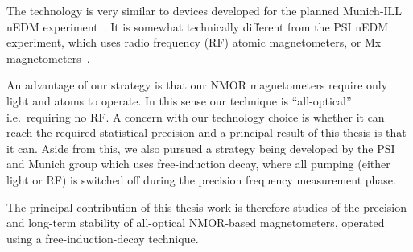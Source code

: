 
The technology is very similar to devices developed for the planned
Munich-ILL nEDM experiment~\cite{mythesis}.  It is somewhat
technically different from the PSI nEDM experiment, which uses radio
frequency (RF) atomic magnetometers, or Mx
magnetometers~\cite{Groeger2006}.

An advantage of our strategy is that our NMOR magnetometers require
only light and atoms to operate.  In this sense our technique is
``all-optical'' i.e.~requiring no RF.  A concern with our technology
choice is whether it can reach the required statistical precision and
a principal result of this thesis is that it can.  Aside from this, we
also pursued a strategy being developed by the PSI and Munich group
which uses free-induction decay, where all pumping (either light or
RF) is switched off during the precision frequency measurement phase.






The principal contribution of this thesis work is therefore studies of
the precision and long-term stability of all-optical NMOR-based
magnetometers, operated using a free-induction-decay technique.

